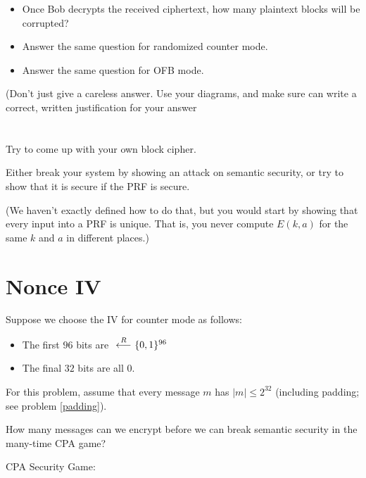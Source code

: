 \documentclass[12pt]{article}
\begin{document}
\begin{itemize}
\item Once Bob decrypts the received ciphertext, how many plaintext blocks will be corrupted?
\item Answer the same question for randomized counter mode.
\item Answer the same question for OFB mode.
\end{itemize}

(Don't just give a careless answer. Use your diagrams, and make sure can write a correct, written justification for your answer 

\section{}

Try to come up with your own block cipher.

Either break your system by showing an attack on semantic security, or try to show that it is secure if the PRF is secure.

(We haven't exactly defined how to do that, but you would start by showing that every input into a PRF is unique. That is, you never compute $E(k, a)$ for the same $k$ and $a$ in different places.)

\section{Nonce IV}

Suppose we choose the IV for counter mode as follows:

\begin{itemize}
\item The first $96$ bits are ${\ \overset{R}\longleftarrow\ } \{0, 1\}^{96}$
\item The final $32$ bits are all $0$.
\end{itemize}

For this problem, assume that every message $m$ has $|m| \leq 2^{32}$ (including padding; see problem \ref{padding}).

How many messages can we encrypt before we can break semantic security in the many-time CPA game?


CPA Security Game:
\begin{center}
\end{center}
\end{document}
